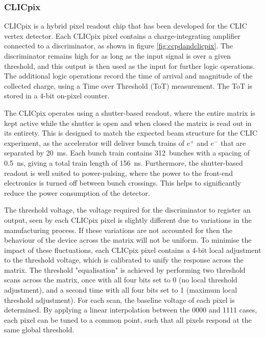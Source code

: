 \subsubsection{CLICpix}

CLICpix is a hybrid pixel readout chip that has been developed for the CLIC vertex detector. Each CLICpix pixel contains a charge-integrating amplifier connected to a discriminator, as shown in figure \ref{fig:ccpdandclicpix}.  The discriminator remains high for as long as the input signal is over a given threshold, and this output is then used as the input for further logic operations.  The additional logic operations record the time of arrival and magnitude of the collected charge, using a Time over Threshold (ToT) measurement. The ToT is stored in a 4-bit on-pixel counter.  

The CLICpix operates using a shutter-based readout, where the entire matrix is kept active while the shutter is open and when closed the matrix is read out in its entirety.  This is designed to match the expected beam structure for the CLIC experiment, as the accelerator will deliver bunch trains of $e^{+}$ and $e^{-}$ that are separated by 20~ms.  Each bunch train contains 312~bunches with a spacing of 0.5~ns, giving a total train length of 156~ns.  Furthermore, the shutter-based readout is well suited to power-pulsing, where the power to the front-end electronics is turned off between bunch crossings.  This helps to significantly reduce the power consumption of the detector.

The threshold voltage, the voltage required for the discriminator to register an output, seen by each CLICpix pixel is slightly different due to variations in the manufacturing process.  If these variations are not accounted for then the behaviour of the device across the matrix will not be uniform.  To minimise the impact of these fluctuations, each CLICpix pixel contains a 4-bit local adjustment to the threshold voltage, which is calibrated to unify the response across the matrix.  The threshold "equalisation" is achieved by performing two threshold scans across the matrix, once with all four bits set to 0 (no local threshold adjustment), and a second time with all four bits set to 1 (maximum local threshold adjustment).  For each scan, the baseline voltage of each pixel is determined. By applying a linear interpolation between the 0000 and 1111 cases, each pixel can be tuned to a common point, such that all pixels respond at the same global threshold.



